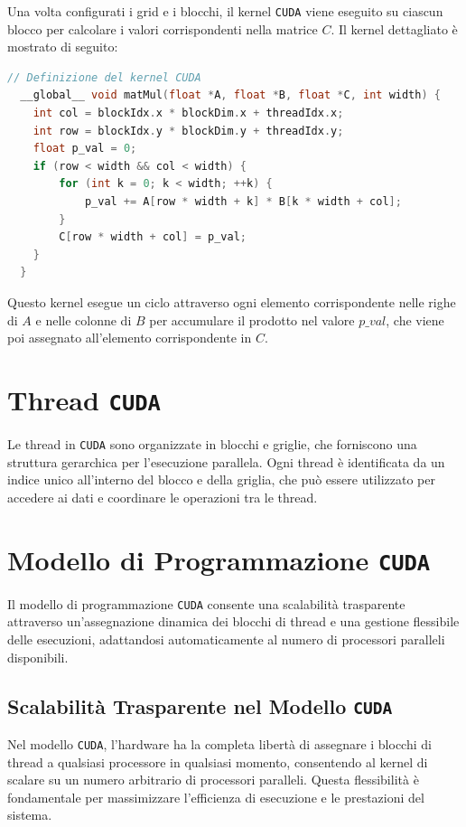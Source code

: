 Una volta configurati i grid e i blocchi, il kernel \texttt{CUDA} viene
eseguito su ciascun blocco per calcolare i valori corrispondenti nella
matrice \(C\). Il kernel dettagliato è mostrato di seguito:

\begin{lstlisting}[language=C]
  // Definizione del kernel CUDA
  __global__ void matMul(float *A, float *B, float *C, int width) {
    int col = blockIdx.x * blockDim.x + threadIdx.x;
    int row = blockIdx.y * blockDim.y + threadIdx.y;
    float p_val = 0;
    if (row < width && col < width) {
        for (int k = 0; k < width; ++k) {
            p_val += A[row * width + k] * B[k * width + col];
        }
        C[row * width + col] = p_val;
    }
  }
\end{lstlisting}

Questo kernel esegue un ciclo attraverso ogni elemento corrispondente
nelle righe di \(A\) e nelle colonne di \(B\) per accumulare il prodotto
nel valore \(p\_val\), che viene poi assegnato all'elemento corrispondente in \(C\).

\section{Thread \texttt{CUDA}}
Le thread in \texttt{CUDA} sono organizzate in blocchi e griglie, che
forniscono una struttura gerarchica per l'esecuzione parallela. Ogni
thread è identificata da un indice unico all'interno del blocco e della
griglia, che può essere utilizzato per accedere ai dati e coordinare
le operazioni tra le thread.

\section{Modello di Programmazione \texttt{CUDA}}
Il modello di programmazione \texttt{CUDA} consente una scalabilità trasparente attraverso un'assegnazione dinamica dei blocchi di thread e una gestione flessibile delle esecuzioni, adattandosi automaticamente al numero di processori paralleli disponibili.

\subsection{Scalabilità Trasparente nel Modello \texttt{CUDA}}
Nel modello \texttt{CUDA}, l'hardware ha 
la completa libertà di assegnare i blocchi di thread a 
qualsiasi processore in qualsiasi momento, consentendo al kernel 
di scalare su un numero arbitrario di processori paralleli. Questa 
flessibilità è fondamentale per massimizzare l'efficienza di 
esecuzione e le prestazioni del sistema. 

